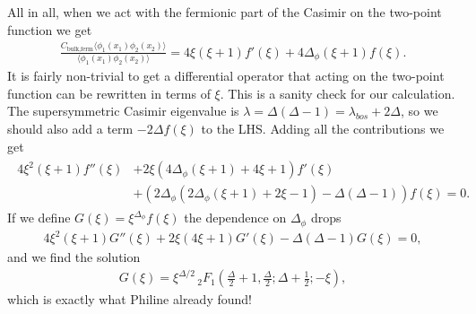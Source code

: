 \documentclass[letterpaper]{article}
\begin{document}
All in all, when we act with the fermionic part of the Casimir on the two-point function we get
\begin{align}
 \frac{C_{\text{bulk,ferm}}\langle \phi_1(x_1) \phi_2(x_2)\rangle}
      {\langle \phi_1(x_1) \phi_2(x_2)\rangle}
 = 
 4 \xi  (\xi +1) f'(\xi )+4 \Delta_\phi (\xi +1) f(\xi ).
\end{align}
It is fairly non-trivial to get a differential operator that acting on the two-point function can be rewritten in terms of $\xi$.
This is a sanity check for our calculation.
The supersymmetric Casimir eigenvalue is $\lambda = \Delta(\Delta-1) = \lambda_{bos} + 2\Delta$, so we should also add a term $-2 \Delta f(\xi)$ to the LHS.
Adding all the contributions we get
\begin{align}
\begin{split}
    4 \xi ^2 (\xi +1) f''(\xi )
& + 2 \xi  (4 \Delta_\phi (\xi +1) + 4 \xi +1) f'(\xi ) \\
& + \left(
     2 \Delta_\phi (2 \Delta_\phi (\xi +1)+2 \xi -1) -\Delta(\Delta-1)
   \right) f(\xi ) 
 = 0.
\end{split}
\end{align}
If we define $G(\xi) = \xi^{\Delta_\phi} f(\xi)$ the dependence on $\Delta_\phi$ drops
\begin{align}
   4 \xi ^2 (\xi +1)  G''(\xi )
 + 2 \xi (4 \xi +1)   G' (\xi )
 - \Delta (\Delta -1) G  (\xi ) = 0,
\end{align}
and we find the solution
\begin{align}
 G(\xi) = \xi ^{\Delta /2} \, _2F_1\left(\frac{\Delta }{2}+1,\frac{\Delta }{2};\Delta +\frac{1}{2};-\xi \right),
\end{align}
which is exactly what Philine already found!
\end{document}
